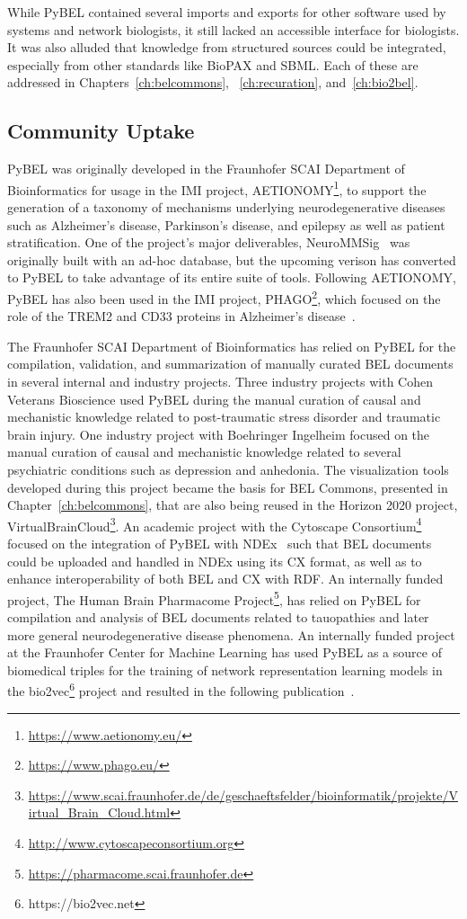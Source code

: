 While PyBEL contained several imports and exports for other software used by systems and network biologists, it still lacked an accessible interface for biologists.
It was also alluded that knowledge from structured sources could be integrated, especially from other standards like \ac{BioPAX} and \ac{SBML}.
Each of these are addressed in Chapters~\ref{ch:belcommons}, ~\ref{ch:recuration}, and~\ref{ch:bio2bel}.

\subsection*{Community Uptake}

PyBEL was originally developed in the Fraunhofer SCAI Department of Bioinformatics for usage in the \ac{IMI} project, AETIONOMY\footnote{\url{https://www.aetionomy.eu/}}, to support the generation of a taxonomy of mechanisms underlying neurodegenerative diseases such as Alzheimer's disease, Parkinson's disease, and epilepsy as well as patient stratification.
One of the project's major deliverables, NeuroMMSig~\cite{Domingo-Fernandez2017} was originally built with an ad-hoc database, but the upcoming verison has converted to PyBEL to take advantage of its entire suite of tools.
Following AETIONOMY, PyBEL has also been used in the \ac{IMI} project, PHAGO\footnote{\url{https://www.phago.eu/}}, which focused on the role of the TREM2 and CD33 proteins in Alzheimer's disease~\cite{Ebeling2017}.

The Fraunhofer SCAI Department of Bioinformatics has relied on PyBEL for the compilation, validation, and summarization of manually curated BEL documents in several internal and industry projects.
Three industry projects with Cohen Veterans Bioscience used PyBEL during the manual curation of causal and mechanistic knowledge related to post-traumatic stress disorder and traumatic brain injury.
One industry project with Boehringer Ingelheim focused on the manual curation of causal and mechanistic knowledge related to several psychiatric conditions such as depression and anhedonia.
The visualization tools developed during this project became the basis for BEL Commons, presented in Chapter~\ref{ch:belcommons}, that are also being reused in the Horizon 2020 project, VirtualBrainCloud\footnote{\url{https://www.scai.fraunhofer.de/de/geschaeftsfelder/bioinformatik/projekte/Virtual_Brain_Cloud.html}}.
An academic project with the Cytoscape Consortium\footnote{\url{http://www.cytoscapeconsortium.org}} focused on the integration of PyBEL with NDEx~\cite{Pratt2015} such that BEL documents could be uploaded and handled in NDEx using its CX format, as well as to enhance interoperability of both \ac{BEL} and CX with \ac{RDF}.
An internally funded project, The Human Brain Pharmacome Project\footnote{\url{https://pharmacome.scai.fraunhofer.de}}, has relied on PyBEL for compilation and analysis of BEL documents related to tauopathies and later more general neurodegenerative disease phenomena.
An internally funded project at the Fraunhofer Center for Machine Learning has used PyBEL as a source of biomedical triples for the training of network representation learning models in the bio2vec\footnote{https://bio2vec.net} project and resulted in the following publication~\cite{Ali2019}.

